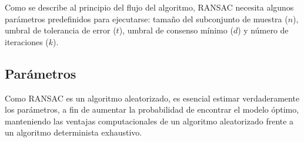 
Como se describe al principio del flujo del algoritmo, RANSAC necesita algunos parámetros predefinidos para ejecutarse: tamaño del subconjunto de muestra ($n$), umbral de tolerancia de error ($t$), umbral de consenso mínimo ($d$) y número de iteraciones ($k$).

\subsection{Parámetros}

Como RANSAC es un algoritmo aleatorizado, es esencial estimar verdaderamente los parámetros, a fin de aumentar la probabilidad de encontrar el modelo óptimo, manteniendo las ventajas computacionales de un algoritmo aleatorizado frente a un algoritmo determinista exhaustivo.\\

